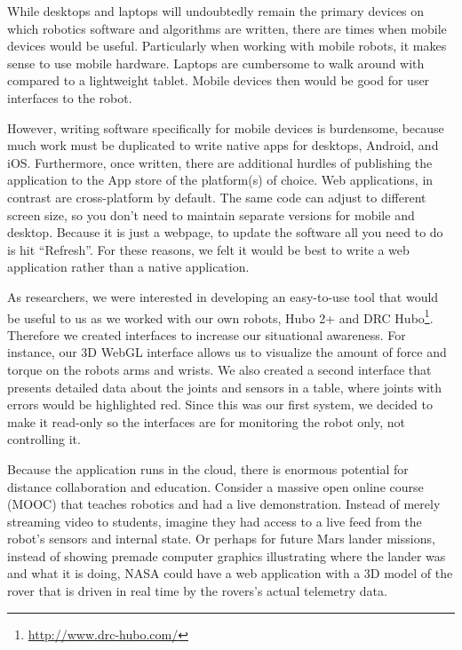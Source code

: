 \documentclass[letterpaper, 10 pt, conference]{ieee/ieeeconf}  %
\begin{document}
While desktops and laptops will undoubtedly remain the primary devices on which robotics software and algorithms are written, there are times when mobile devices would be useful.
Particularly when working with mobile robots, it makes sense to use mobile hardware.
Laptops are cumbersome to walk around with compared to a lightweight tablet.
Mobile devices then would be good for user interfaces to the robot.

However, writing software specifically for mobile devices is burdensome, because much work must be duplicated to write native apps for desktops, Android, and iOS.
Furthermore, once written, there are additional hurdles of publishing the application to the App store of the platform(s) of choice.
Web applications, in contrast are cross-platform by default.
The same code can adjust to different screen size, so you don't need to maintain separate versions for mobile and desktop.
Because it is just a webpage, to update the software all you need to do is hit ``Refresh''.
For these reasons, we felt it would be best to write a web application rather than a native application.

As researchers, we were interested in developing an easy-to-use tool that would be useful to us as we worked with our own robots, Hubo 2+ \cite{park2007mechanical} and DRC Hubo\footnote{\url{http://www.drc-hubo.com/}}.  
Therefore we created interfaces to increase our situational awareness.
For instance, our 3D WebGL interface allows us to visualize the amount of force and torque on the robots arms and wrists.
We also created a second interface that presents detailed data about the joints and sensors in a table, where joints with errors would be highlighted red.
Since this was our first system, we decided to make it read-only so the interfaces are for monitoring the robot only, not controlling it.

Because the application runs in the cloud, there is enormous potential for distance collaboration and education.
Consider a massive open online course (MOOC) that teaches robotics and had a live demonstration.
Instead of merely streaming video to students, imagine they had access to a live feed from the robot's sensors and internal state.
Or perhaps for future Mars lander missions, instead of showing premade computer graphics illustrating where the lander was and what it is doing, NASA could have a web application with a 3D model of the rover that is driven in real time by the rovers's actual telemetry data.
\end{document}
